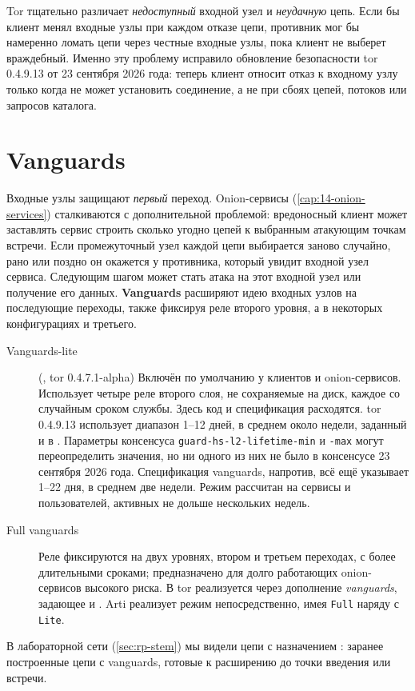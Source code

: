 \begin{attenzione}
Tor тщательно различает \emph{недоступный} входной узел и \emph{неудачную} цепь. Если бы клиент менял входные узлы при каждом отказе цепи, противник мог бы намеренно ломать цепи через честные входные узлы, пока клиент не выберет враждебный. Именно эту проблему исправило обновление безопасности tor 0.4.9.13 от 23 сентября 2026 года: теперь клиент относит отказ к входному узлу только когда не может установить соединение, а не при сбоях цепей, потоков или запросов каталога.
\end{attenzione}

\section{Vanguards}\label{sec:vanguards}

Входные узлы защищают \emph{первый} переход. Onion-сервисы (\cref{cap:14-onion-services}) сталкиваются с дополнительной проблемой: вредоносный клиент может заставлять сервис строить сколько угодно цепей к выбранным атакующим точкам встречи. Если промежуточный узел каждой цепи выбирается заново случайно, рано или поздно он окажется у противника, который увидит входной узел сервиса. Следующим шагом может стать атака на этот входной узел или получение его данных. \textbf{Vanguards} расширяют идею входных узлов на последующие переходы, также фиксируя реле второго уровня, а в некоторых конфигурациях и третьего.

\begin{description}
  \item[Vanguards-lite] (, tor 0.4.7.1-alpha) Включён по умолчанию у клиентов и onion-сервисов. Использует четыре реле второго слоя, не сохраняемые на диск, каждое со случайным сроком службы. Здесь код и спецификация расходятся. tor 0.4.9.13 использует диапазон 1--12 дней, в среднем около недели, заданный  и  в . Параметры консенсуса \texttt{guard-hs-l2-lifetime-min} и \texttt{-max} могут переопределить значения, но ни одного из них не было в консенсусе 23 сентября 2026 года. Спецификация vanguards, напротив, всё ещё указывает 1--22 дня, в среднем две недели. Режим рассчитан на сервисы и пользователей, активных не дольше нескольких недель.
  \item[Full vanguards] Реле фиксируются на двух уровнях, втором и третьем переходах, с более длительными сроками; предназначено для долго работающих onion-сервисов высокого риска. В tor реализуется через дополнение \emph{vanguards}, задающее  и . Arti реализует режим непосредственно, имея \texttt{Full} наряду с \texttt{Lite}.
\end{description}
В лабораторной сети (\cref{sec:rp-stem}) мы видели цепи с назначением : заранее построенные цепи с vanguards, готовые к расширению до точки введения или встречи.

